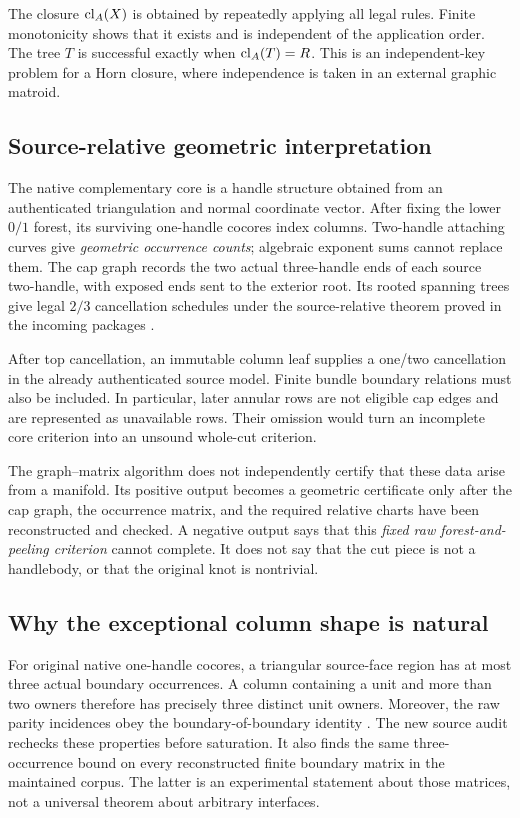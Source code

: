 The closure $\operatorname{cl}_A(X)$ is obtained by repeatedly applying all legal
rules. Finite monotonicity shows that it exists and is independent of the
application order. The tree $T$ is successful exactly when
$\operatorname{cl}_A(T)=R$. This is an independent-key problem for a Horn closure,
where independence is taken in an external graphic matroid.

\subsection{Source-relative geometric interpretation}

The native complementary core is a handle structure obtained from an
authenticated triangulation and normal coordinate vector. After fixing
the lower $0/1$ forest, its surviving one-handle cocores index columns.
Two-handle attaching curves give \emph{geometric occurrence counts};
algebraic exponent sums cannot replace them. The cap graph records the
two actual three-handle ends of each source two-handle, with exposed ends
sent to the exterior root. Its rooted spanning trees give legal $2/3$
cancellation schedules under the source-relative theorem proved in the
incoming packages \cite{repo-dual-normalization,repo-relative-top}.

After top cancellation, an immutable column leaf supplies a one/two
cancellation in the already authenticated source model. Finite bundle
boundary relations must also be included. In particular, later annular
rows are not eligible cap edges and are represented as unavailable rows.
Their omission would turn an incomplete core criterion into an unsound
whole-cut criterion.

The graph--matrix algorithm does not independently certify that these
data arise from a manifold. Its positive output becomes a geometric
certificate only after the cap graph, the occurrence matrix, and the
required relative charts have been reconstructed and checked. A negative
output says that this \emph{fixed raw forest-and-peeling criterion} cannot
complete. It does not say that the cut piece is not a handlebody, or that
the original knot is nontrivial.

\subsection{Why the exceptional column shape is natural}

For original native one-handle cocores, a triangular source-face region
has at most three actual boundary occurrences. A column containing a
unit and more than two owners therefore has precisely three distinct
unit owners. Moreover, the raw parity incidences obey the
boundary-of-boundary identity \cite{repo-dual-normalization}. The new
source audit rechecks these properties before saturation. It also finds
the same three-occurrence bound on every reconstructed finite boundary
matrix in the maintained corpus. The latter is an experimental statement
about those matrices, not a universal theorem about arbitrary interfaces.

